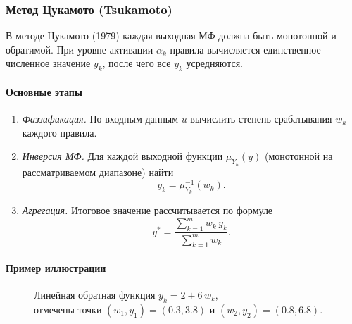 \subsubsection{Метод Цукамото (Tsukamoto)}
\label{subsubsec:tsukamoto}

В методе Цукамото (1979) каждая выходная МФ должна быть монотонной и обратимой. При уровне активации $\alpha_k$ правила вычисляется единственное численное значение $y_k$, после чего все $y_k$ усредняются.

\paragraph{Основные этапы}
\begin{enumerate}
  \item \emph{Фаззификация.} По входным данным $u$ вычислить степень срабатывания $w_k$ каждого правила.
  \item \emph{Инверсия МФ.} Для каждой выходной функции $\mu_{Y_k}(y)$ (монотонной на рассматриваемом диапазоне) найти
    \[
      y_k = \mu_{Y_k}^{-1}(w_k).
    \]
  \item \emph{Агрегация.} Итоговое значение рассчитывается по формуле
    \[
      y^* = \frac{\sum_{k=1}^m w_k\,y_k}{\sum_{k=1}^m w_k}.
    \]
\end{enumerate}

\paragraph{Пример иллюстрации}
\begin{figure}[H]
  \centering
  \caption{%
    Линейная обратная функция $y_k=2+6\,w_k$, \\
    отмечены точки $(w_1,y_1)=(0.3,3.8)$ и $(w_2,y_2)=(0.8,6.8)$.}
\end{figure}

